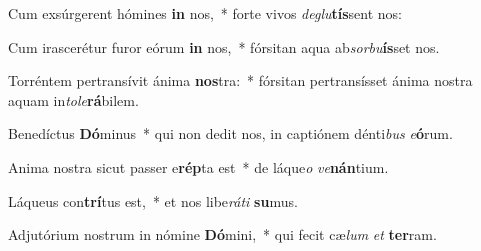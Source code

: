 \item Cum exsúrgerent hómines \textbf{in} nos,~* forte vivos \textit{de}\textit{glu}\textbf{tís}sent nos:
\item Cum irascerétur furor eórum \textbf{in} nos,~* fórsitan aqua ab\textit{sor}\textit{bu}\textbf{ís}set nos.
\item Torréntem pertransívit ánima \textbf{nos}tra:~* fórsitan pertransísset ánima nostra aquam in\textit{to}\textit{le}\textbf{rá}bilem.
\item Benedíctus \textbf{Dó}minus~* qui non dedit nos, in captiónem dénti\textit{bus} \textit{e}\textbf{ó}rum.
\item Anima nostra sicut passer e\textbf{rép}ta est~* de láque\textit{o} \textit{ve}\textbf{nán}tium.
\item Láqueus con\textbf{trí}tus est,~* et nos libe\textit{rá}\textit{ti} \textbf{su}mus.
\item Adjutórium nostrum in nómine \textbf{Dó}mini,~* qui fecit cæ\textit{lum} \textit{et} \textbf{ter}ram.

